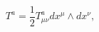 \begin{equation}
T^a=\frac{1}{2}T_{\mu \nu }^adx^\mu \wedge dx^\nu ,  \label{tors0}
\end{equation}

